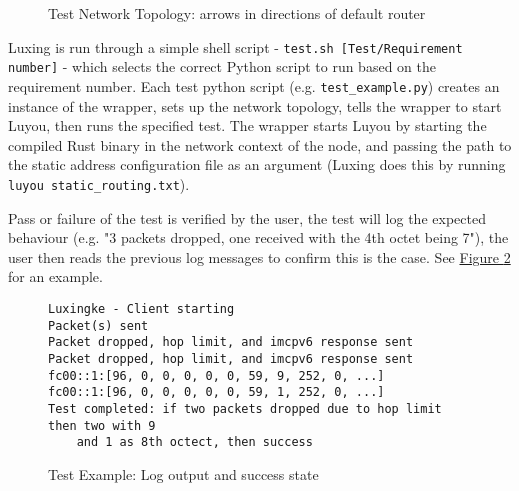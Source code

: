 \documentclass[12pt,a4paper,twoside,openany]{report}
\begin{document}
\begin{figure}
\centering
{}
\caption{Test Network Topology: arrows in directions of default router}
\label{fig::test_network}
\end{figure}

\bigskip

Luxing is run through a simple shell script - \verb!test.sh [Test/Requirement number]! - which selects the correct Python script to run based on the requirement number. Each test python script (e.g. \verb!test_example.py!) creates an instance of the wrapper, sets up the network topology, tells the wrapper to start Luyou, then runs the specified test. The wrapper starts Luyou by starting the compiled Rust binary in the network context of the node, and passing the path to the static address configuration file as an argument (Luxing does this by running \verb!luyou static_routing.txt!).

\bigskip

Pass or failure of the test is verified by the user, the test will log the expected behaviour (e.g. "3 packets dropped, one received with the 4th octet being 7"), the user then reads the previous log messages to confirm this is the case. See \hyperref[fig::test_success]{Figure }\ref{fig::test_success} for an example.

\begin{figure}
\begin{verbatim}
Luxingke - Client starting
Packet(s) sent
Packet dropped, hop limit, and imcpv6 response sent
Packet dropped, hop limit, and imcpv6 response sent
fc00::1:[96, 0, 0, 0, 0, 0, 59, 9, 252, 0, ...]
fc00::1:[96, 0, 0, 0, 0, 0, 59, 1, 252, 0, ...]
Test completed: if two packets dropped due to hop limit then two with 9 
    and 1 as 8th octect, then success
\end{verbatim}
\caption{Test Example: Log output and success state}
\label{fig::test_success}
\end{figure}
\end{document}
